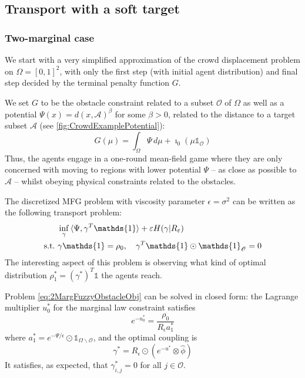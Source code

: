 \documentclass[../report.tex]{subfiles}
\begin{document}
\subsection{Transport with a soft target}

\subsubsection{Two-marginal case}

We start with a very simplified approximation of the crowd displacement problem on $\Omega = [0, 1]^2$, with only the first step (with initial agent distribution) and final step decided by the terminal penalty function $G$.

We set $G$ to be the obstacle constraint  related to a subset $\mathscr{O}$ of $\Omega$ as well as a potential $\Psi(x) = d(x, \mathscr A)^{\beta}$ for some $\beta > 0$, related to the distance to a target subset $\mathscr{A}$ (see \cref{fig:CrowdExamplePotential}):
\[
	G(\mu) = \int_\Omega \Psi\,d\mu + \imath_{0}(\mu\mathds{1}_{\mathscr O})
\]
Thus, the agents engage in a one-round mean-field game where they are only concerned with moving to regions with lower potential $\Psi$ -- as close as possible to $\mathscr{A}$ -- whilst obeying physical constraints related to the obstacles.

The discretized MFG problem with viscosity parameter $\epsilon = \sigma^2$ can be written as the following transport problem:
\begin{equation}\label{eq:2MargFuzzyObstacleObj}
\begin{aligned}
	&\inf_\gamma{} \langle \Psi, \gamma^T\mathds{1}\rangle + \epsilon H(\gamma | R_\epsilon) \\
	\suchthat\ & \gamma\mathds{1} = \rho_0, \quad \gamma^T\mathds{1} \odot \mathds{1}_{\mathscr{O}} = 0
	\end{aligned}
\end{equation}
The interesting aspect of this problem is observing what kind of optimal distribution $\rho^*_1 = (\gamma^*)^T\mathds{1}$ the agents reach.

\begin{prop}\label{thm:2MargFuzzyTarget}
Problem \eqref{eq:2MargFuzzyObstacleObj} can be solved in closed form: the Lagrange multiplier $u_0^*$ for the marginal law constraint satisfies
\[
e^{-u_0^*}  = \frac{\rho_0}{R_\epsilon a^*_1}
\]
where $a^*_1 = e^{-\Psi/\epsilon}\odot\mathds{1}_{\Omega\backslash\mathscr{O}}$, and the optimal coupling is
\[
	\gamma^* = R_\epsilon \odot (e^{-u^*}\otimes \hat{\phi})	
\]
It satisfies, as expected, that $\gamma^*_{i,j} = 0$ for all $j\in\mathscr{O}$.
\end{prop}
 
\end{document}
